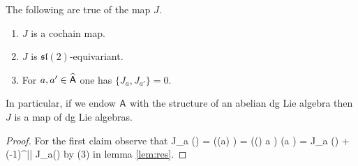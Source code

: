 \documentclass[11pt]{amsart}
\newcommand{\laurent}{\Hat \sfA}
\def\lie#1{\ensuremath{\mathfrak{#1}}}
\begin{document}
\begin{lem}
The following are true of the map $J$.
\begin{enumerate}
\item $J$ is a cochain map.
\item $J$ is $\lie{sl}(2)$-equivariant.
\item For $a,a' \in \laurent$ one has $\{J_a, J_{a'}\} = 0$.
\end{enumerate}
In particular, if we endow $\mathsf A$ with the structure of an abelian dg Lie algebra then $J$ is a map of dg Lie algebras.
\end{lem}
\begin{proof}
For the first claim observe that
\beqn
J_{\dbar a} (\beta \gamma) = \Res(\beta (\dbar a) \gamma) = \pm \Res((\dbar \beta) a \gamma) \pm \Res(\beta a \dbar \gamma) = J_a (\dbar \beta \gamma) + (-1)^{|\beta|} J_a(\beta \dbar \gamma) 
\eeqn
by (3) in lemma \ref{lem:res}.
\end{proof}
\end{document}
